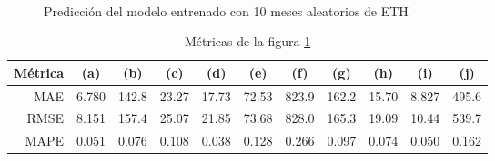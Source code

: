 \documentclass[a4paper,10pt]{article}
\begin{document}
\begin{figure}[H]
    \\
  \caption{Predicción del modelo entrenado con 10 meses aleatorios de ETH}
  \label{f:eth_mth_prophet}
\end{figure}

\begin{table}[H]
 \begin{center}
 \resizebox{12cm}{!} {
  \begin{tabular}{|r|c|c|c|c|c|c|c|c|c|c|}
    Métrica & (a) & (b) & (c) & (d) & (e) & (f) & (g) & (h) & (i) & (j) \\ \hline
    MAE  & 6.780& 142.8& 23.27& 17.73& 72.53& 823.9& 162.2& 15.70& 8.827& 495.6\\
    RMSE & 8.151& 157.4& 25.07& 21.85&73.68& 828.0& 165.3& 19.09& 10.44& 539.7\\
    MAPE & 0.051& 0.076& 0.108& 0.038& 0.128& 0.266& 0.097& 0.074& 0.050& 0.162\\ \hline
  \end{tabular}
  }
  \caption{Métricas de la figura \ref{f:eth_mth_prophet}}
  \label{tab:eth_prophet_m}
 \end{center}
\end{table}
\end{document}
